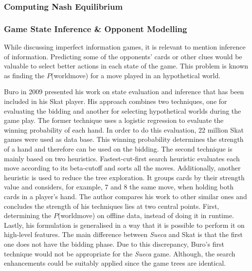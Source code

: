 \subsubsection{Computing Nash Equilibrium}






\subsubsection{Game State Inference \& Opponent Modelling}


While discussing imperfect information games, it is relevant to mention inference of information.
Predicting some of the opponents' cards or other clues would be valuable to select better actions in each state of the game.
This problem is known as finding the $P$(world\textbar move) for a move played in an hypothetical world.


Buro in 2009 \cite{Buro} presented his work on state evaluation and inference that has been included in his Skat player.
His approach combines two techniques, one for evaluating the bidding and another for selecting hypothetical worlds during the game play.
The former technique uses a logistic regression to evaluate the winning probability of each hand.
In order to do this evaluation, 22 million Skat games were used as data base.
This winning probability determines the strength of a hand and therefore can be used on the bidding.
The second technique is mainly based on two heuristics.
Fastest-cut-first search heuristic evaluates each move according to its beta-cutoff and sorts all the moves.
Additionally, another heuristic is used to reduce the tree exploration.
It groups cards by their strength value and considers, for example, 7 and 8 the same move, when holding both cards in a player's hand.
The author compares his work to other similar ones and concludes the strength of his techniques lies at two central points.
First, determining the $P$(world\textbar move) on offline data, instead of doing it in runtime.
Lastly, his formulation is generalised in a way that it is possible to perform it on high-level features.
The main difference between \emph{Sueca} and Skat is that the first one does not have the bidding phase.
Due to this discrepancy, Buro's first technique would not be appropriate for the \emph{Sueca} game.
Although, the search enhancements could be suitably applied since the game trees are identical.



